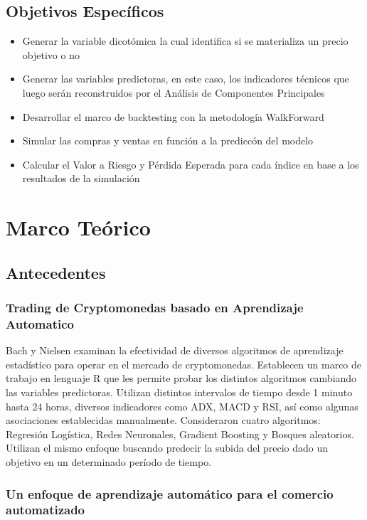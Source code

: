 \documentclass[a4paper,12pt]{Latex/Classes/PhDthesisPSnPDF}
\begin{document}
\section{Objetivos Específicos}

\begin{itemize}
\item Generar la variable dicotómica la cual identifica si se materializa un precio objetivo o no
\item Generar las variables predictoras, en este caso, los indicadores técnicos que luego serán reconstruidos por el Análisis de Componentes Principales
\item Desarrollar el marco de backtesting con la metodología WalkForward
\item Simular las compras y ventas en función a la prediccón del modelo 
\item Calcular el Valor a Riesgo y Pérdida Esperada para cada índice en base a los resultados de la simulación
\end{itemize}


\chapter{Marco Teórico}

\section{Antecedentes}

\subsection{Trading de Cryptomonedas basado en Aprendizaje Automatico}

Bach y Nielsen examinan la efectividad de diversos algoritmos de aprendizaje estadístico para operar en el mercado de cryptomonedas. Establecen un marco de trabajo en lenguaje R que les permite probar los distintos algoritmos cambiando las variables predictoras. Utilizan distintos intervalos de tiempo desde 1 minuto hasta 24 horas, diversos indicadores como ADX, MACD y RSI, así como algunas asociaciones establecidas manualmente. Consideraron cuatro algoritmos: Regresión Logística, Redes Neuronales, Gradient Boosting y Bosques aleatorios. Utilizan el mismo enfoque buscando predecir la subida del precio dado un objetivo en un determinado período de tiempo.

\subsection{Un enfoque de aprendizaje automático para el comercio automatizado}
\end{document}
